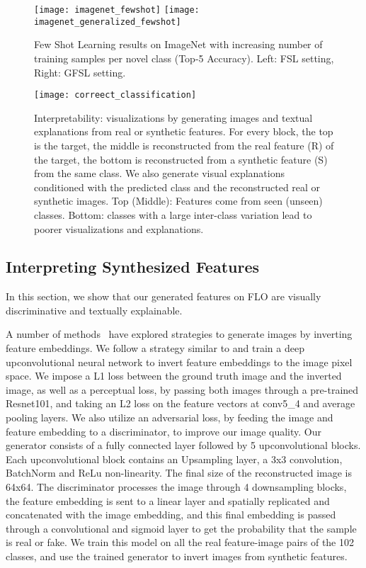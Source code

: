 \documentclass[10pt,twocolumn,letterpaper]{article}
\newcommand{\myparagraph}[1]{\vspace{5pt}\noindent{\bf #1}}
\begin{document}
\begin{figure}[t]
	\centering
		\texttt{[image: imagenet\_fewshot]}
        \texttt{[image: imagenet\_generalized\_fewshot]}
	\caption{Few Shot Learning results on ImageNet with increasing number of training samples per novel class (Top-5 Accuracy). Left: FSL setting, Right: GFSL setting.}
	\label{fig:imagenet_fsl}
\end{figure}



\begin{figure*}[t]
	\centering
     \texttt{[image: correect\_classification]}
        \caption{Interpretability: visualizations by generating images and textual explanations from real or synthetic features. For every block, the top is the target, the middle is reconstructed from the real feature (R) of the target, the bottom is reconstructed from a synthetic feature (S) from the same class. We also generate visual explanations conditioned with the predicted class and the reconstructed real or synthetic images. Top (Middle): Features come from seen (unseen) classes. Bottom: classes with a large inter-class variation lead to poorer visualizations and explanations.}
	\label{fig:inverting_features}
\end{figure*}


\subsection{Interpreting Synthesized Features}

In this section, we show that our generated features on FLO are visually discriminative and textually explainable. 

\myparagraph{Visualising generated features.}
A number of methods~\cite{dosovitskiy2016generating,mahendran2015understanding,dosovitskiy2016inverting} have explored strategies to generate images by inverting feature embeddings. We follow a strategy similar to \cite{dosovitskiy2016generating} and train a deep upconvolutional neural network to invert feature embeddings to the image pixel space. We impose a L1 loss between the ground truth image and the inverted image, as well as a perceptual loss, by passing both images through a pre-trained Resnet101, and taking an L2 loss on the feature vectors at conv5\_4 and average pooling layers. We also utilize an adversarial loss, by feeding the image and feature embedding to a discriminator, to improve our image quality. Our generator consists of a fully connected layer followed by 5 upconvolutional blocks. Each upconvolutional block contains an Upsampling layer, a 3x3 convolution, BatchNorm and ReLu non-linearity. The final size of the reconstructed image is 64x64. The discriminator processes the image through 4 downsampling blocks, the feature embedding is sent to a linear layer and spatially replicated and concatenated with the image embedding, and this final embedding is passed through a convolutional and sigmoid layer to get the probability that the sample is real or fake. We train this model on all the real feature-image pairs of the 102 classes, and use the trained generator to invert images from synthetic features. 
\end{document}
